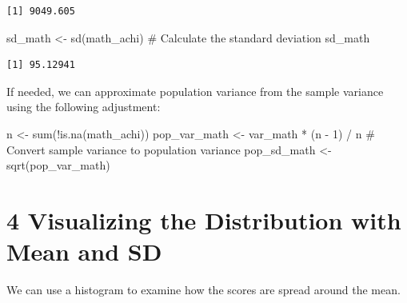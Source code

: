 \documentclass[
  letterpaper,
  DIV=11,
  numbers=noendperiod]{scrreprt}
\newenvironment{Shaded}{\begin{snugshade}}{\end{snugshade}}
\newcommand{\CommentTok}[1]{\textcolor[rgb]{0.37,0.37,0.37}{#1}}
\newcommand{\DecValTok}[1]{\textcolor[rgb]{0.68,0.00,0.00}{#1}}
\newcommand{\FunctionTok}[1]{\textcolor[rgb]{0.28,0.35,0.67}{#1}}
\newcommand{\NormalTok}[1]{\textcolor[rgb]{0.00,0.23,0.31}{#1}}
\newcommand{\OtherTok}[1]{\textcolor[rgb]{0.00,0.23,0.31}{#1}}
\newcommand{\SpecialCharTok}[1]{\textcolor[rgb]{0.37,0.37,0.37}{#1}}
\begin{document}
\begin{verbatim}
[1] 9049.605
\end{verbatim}

\begin{Shaded}
\begin{Highlighting}[]
\NormalTok{sd\_math }\OtherTok{\textless{}{-}} \FunctionTok{sd}\NormalTok{(math\_achi) }\CommentTok{\# Calculate the standard deviation }
\NormalTok{sd\_math }
\end{Highlighting}
\end{Shaded}

\begin{verbatim}
[1] 95.12941
\end{verbatim}

If needed, we can approximate population variance from the sample
variance using the following adjustment:

\begin{Shaded}
\begin{Highlighting}[]
\NormalTok{n }\OtherTok{\textless{}{-}} \FunctionTok{sum}\NormalTok{(}\SpecialCharTok{!}\FunctionTok{is.na}\NormalTok{(math\_achi))  }
\NormalTok{pop\_var\_math }\OtherTok{\textless{}{-}}\NormalTok{ var\_math }\SpecialCharTok{*}\NormalTok{ (n }\SpecialCharTok{{-}} \DecValTok{1}\NormalTok{) }\SpecialCharTok{/}\NormalTok{ n  }\CommentTok{\# Convert sample variance to population variance }
\NormalTok{pop\_sd\_math }\OtherTok{\textless{}{-}} \FunctionTok{sqrt}\NormalTok{(pop\_var\_math) }
\end{Highlighting}
\end{Shaded}

\section*{4 Visualizing the Distribution with Mean and
SD}\label{visualizing-the-distribution-with-mean-and-sd}


We can use a histogram to examine how the scores are spread around the
mean.
\end{document}

